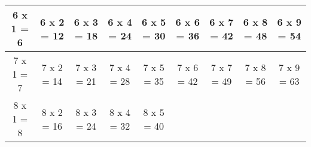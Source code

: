 \documentclass[a4paper,landscape,11pt]{article}
\begin{document}
\begin{tabular}{|c|c|c|c|c|c|c|c|c|}
  
  \\ \hline
  
  
  6 x 1 = 6
  
  &
  
  
  6 x 2 = 12
  
  &
  
  
  6 x 3 = 18
  
  &
  
  
  6 x 4 = 24
  
  &
  
  
  6 x 5 = 30
  
  &
  
  
  6 x 6 = 36
  
  &
  
  
  6 x 7 = 42
  
  &
  
  
  6 x 8 = 48
  
  &
  
  
  6 x 9 = 54
  
  
  \\ \hline
  
  
  7 x 1 = 7
  
  &
  
  
  7 x 2 = 14
  
  &
  
  
  7 x 3 = 21
  
  &
  
  
  7 x 4 = 28
  
  &
  
  
  7 x 5 = 35
  
  &
  
  
  7 x 6 = 42
  
  &
  
  
  7 x 7 = 49
  
  &
  
  
  7 x 8 = 56
  
  &
  
  
  7 x 9 = 63
  
  
  \\ \hline
  
  
  8 x 1 = 8
  
  &
  
  
  8 x 2 = 16
  
  &
  
  
  8 x 3 = 24
  
  &
  
  
  8 x 4 = 32
  
  &
  
  
  8 x 5 = 40
  
  &
  

\end{tabular}
\end{document}
